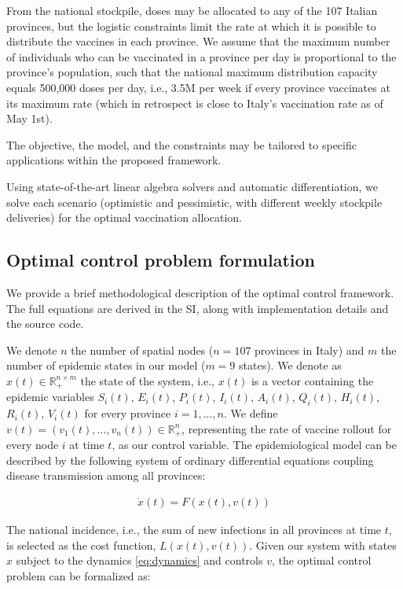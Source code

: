 From the national stockpile, doses may be allocated to any of the 107 Italian provinces, but the logistic constraints limit the rate at which it is possible to distribute the vaccines in each province. We assume that the maximum number of individuals who can be vaccinated in a province per day is proportional to the province's population, such that the national maximum distribution capacity equals 500,000 doses per day, i.e., 3.5M per week if every province vaccinates at its maximum rate (which in retrospect is close to Italy's vaccination rate as of May 1st). 

The objective, the model, and the constraints may be tailored to specific applications within the proposed framework.

Using state-of-the-art linear algebra solvers and automatic differentiation, we solve each scenario (optimistic and pessimistic, with different weekly stockpile deliveries) for the optimal vaccination allocation.

\subsection*{Optimal control problem formulation}
We provide a brief methodological description of the optimal control framework. The full equations are derived in the SI, along with implementation details and the source code.

We denote $n$ the number of spatial nodes ($n=107$ provinces in Italy) and $m$ the number of epidemic states in our model ($m=9$ states).
We denote as $x(t) \in \mathbb{R}_+^{n\times m}$ the state of the system, i.e., $x(t)$ is a vector containing the epidemic variables $S_i(t)$, $E_i(t)$, $P_i(t)$, $I_i(t)$, $A_i(t)$, $Q_i(t)$, $H_i(t)$, $R_i(t)$, $V_i(t)$ for every province $i=1,...,n$. We define $v(t) = (v_1(t),...,v_n(t)) \in \mathbb{R}_+^{n}$, representing the rate of vaccine rollout for every node $i$ at time $t$, as our control variable. %
The epidemiological model can be described by the following system of ordinary differential equations coupling disease transmission among all provinces:

\begin{align}
    \dot x(t) = F(x(t),v(t))
    \label{eq:dynamics}
\end{align}

The national incidence, i.e., the sum of new infections in all provinces at time $t$, is selected as the cost function, $L(x(t), v(t))$.
Given our system with states $x$ subject to the dynamics \eqref{eq:dynamics} and controls $v$, the optimal control problem can be formalized as:

